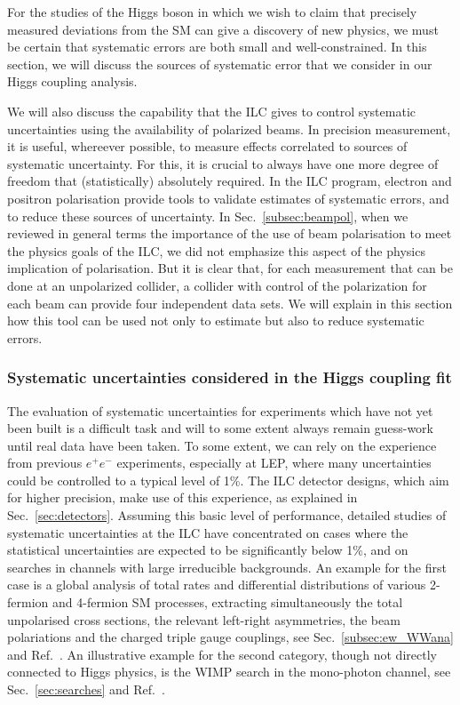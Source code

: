 
  For the studies of the Higgs boson in which we wish to claim that precisely measured deviations from the SM can give a discovery of new physics, we must be certain that systematic errors are both small and well-constrained.  In this section, we will discuss 
the sources of systematic error that we consider in our Higgs coupling analysis.

We will also discuss the capability that the ILC gives to control systematic uncertainties using the availability of polarized beams. In precision measurement, it is useful, whereever possible, to  measure effects correlated to sources of systematic uncertainty.  For this, it is crucial to always have one more degree of freedom that (statistically) absolutely required.  In the ILC program, electron and positron polarisation
provide tools to validate estimates of systematic errors, and to reduce these 
sources of uncertainty.  In Sec.~\ref{subsec:beampol}, when we reviewed in general terms the importance of the
 use of beam polarisation to meet the physics goals of the ILC, we did not emphasize this 
aspect of the physics implication of polarisation.  But it is clear that, for each measurement that can be done at an unpolarized collider, a collider with control of the polarization for each beam can provide four independent data sets.  We will explain in this section how this tool 
can be used not only to estimate but also to reduce systematic errors.


\subsubsection{Systematic uncertainties considered in the Higgs coupling fit}
\label{subsubsec:sysuncert}
The evaluation of systematic uncertainties for experiments which have not yet been built is a difficult task and will to some extent always remain guess-work until real data have been taken. To some extent, we can rely on the experience from previous $e^+e^-$ experiments, especially at LEP, where many uncertainties could be controlled to a typical level of 1\%.
The ILC detector designs, which aim for higher precision, make use of this experience,
as explained in Sec.~\ref{sec:detectors}.  Assuming this basic level of performance, detailed studies of systematic uncertainties at the ILC have concentrated on cases where the statistical uncertainties are expected to be significantly below 1\%, and on searches in channels with large irreducible backgrounds. An example for the first case is a global analysis of total rates and differential distributions of various 2-fermion and 4-fermion SM processes, extracting simultaneously the total unpolarised cross sections, the relevant left-right asymmetries, the beam polariations and the charged triple gauge couplings, see Sec.~\ref{subsec:ew_WWana} and Ref.~\cite{bib:PhDRobert}. An illustrative example for the second category, though not directly connected to Higgs physics, is the WIMP search in the mono-photon channel, see Sec.~\ref{sec:searches} and Ref.~\cite{Habermehl:417605}. 

